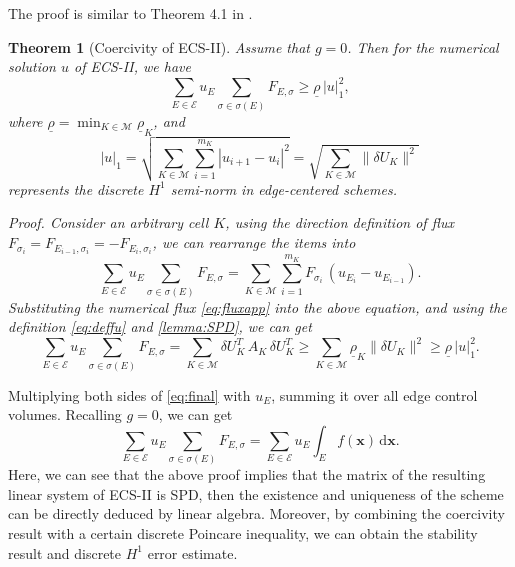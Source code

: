 \documentclass[times,review,preprint]{elsarticle}
\newtheorem{theorem}{Theorem}
\newcommand{\bx}{\bm{x}}
\begin{document}
The proof is similar to Theorem 4.1 in \cite{dong_analysis_2020}.

\begin{theorem}[Coercivity of ECS-II]
Assume that $g = 0$. Then for the numerical solution $u$ of ECS-II, we have
\begin{equation}
\sum_{E \in \mathcal{E}} u_{E} \sum_{\sigma \in \sigma(E)} F_{E, \sigma} \geq \underline{\rho} \, |u|_{1}^2,
\end{equation}
where $\underline{\rho} = \min_{K \in \mathcal{M}} \underline{\rho}_{K}$, and 
$$|u|_{1} = \sqrt{ \sum_{K \in \mathcal{M}} \sum_{i=1}^{m_K} |u_{i+1} - u_{i}|^2 } = \sqrt{\sum_{K \in \mathcal{M}} \|\delta U_K\|^2 }$$
represents the discrete $H^1$ semi-norm in edge-centered schemes. 
\end{theorem}

\em{Proof.} Consider an arbitrary cell $K$, using the direction definition of flux $F_{\sigma_{i}} = F_{E_{i-1}, \sigma_{i}} = - F_{E_{i}, \sigma_{i}}$, we can rearrange the items into
\begin{equation*}
\sum_{E \in \mathcal{E}} u_{E} \sum_{\sigma \in \sigma(E)} F_{E, \sigma} = \sum_{K \in \mathcal{M}} \sum_{i=1}^{m_K} F_{\sigma_{i}} \, (u_{E_{i}} - u_{E_{i-1}}).
\end{equation*}
Substituting the numerical flux \cref{eq:fluxapp} into the above equation, and using the definition \cref{eq:deffu} and \cref{lemma:SPD}, we can get
\begin{equation*}
\sum_{E \in \mathcal{E}} u_{E} \sum_{\sigma \in \sigma(E)} F_{E, \sigma} = \sum_{K \in \mathcal{M}} \delta U_K^T \, A_K \, \delta U_K^T \geq \sum_{K \in \mathcal{M}} \underline{\rho}_K \|\delta U_K\|^2 \geq \underline{\rho} \, |u|_{1}^2.
\end{equation*}

Multiplying both sides of \cref{eq:final} with $u_E$, summing it over all edge control volumes. Recalling $g = 0$, we can get
\begin{equation*}
\sum_{E \in \mathcal{E}} u_{E} \sum_{\sigma \in \sigma(E)} F_{E, \sigma} = \sum_{E \in \mathcal{E}} u_{E} \int_{E} f(\bx) \, \mathrm{d} \bx.
\end{equation*}
Here, we can see that the above proof implies that the matrix of the resulting linear system of ECS-II is SPD, then the existence and uniqueness of the scheme can be directly deduced by linear algebra. Moreover, by combining the coercivity result with a certain discrete Poincare inequality, we can obtain the stability result and discrete $H^1$ error estimate.
\end{document}
